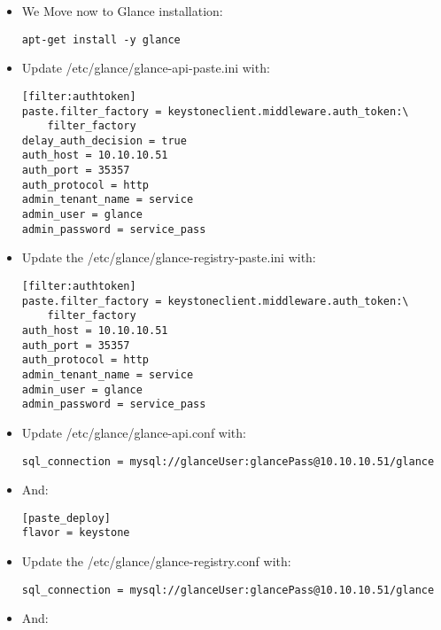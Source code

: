 \begin{itemize}
\item We Move now to Glance installation:

\begin{verbatim}
apt-get install -y glance
\end{verbatim}


\item Update \slash etc\slash glance\slash glance-api-paste.ini with:

\begin{verbatim}
[filter:authtoken]  
paste.filter_factory = keystoneclient.middleware.auth_token:\
    filter_factory  
delay_auth_decision = true  
auth_host = 10.10.10.51  
auth_port = 35357  
auth_protocol = http  
admin_tenant_name = service  
admin_user = glance  
admin_password = service_pass  
\end{verbatim}


\item Update the \slash etc\slash glance\slash glance-registry-paste.ini with:

\begin{verbatim}
[filter:authtoken]  
paste.filter_factory = keystoneclient.middleware.auth_token:\
    filter_factory  
auth_host = 10.10.10.51  
auth_port = 35357  
auth_protocol = http  
admin_tenant_name = service  
admin_user = glance  
admin_password = service_pass  
\end{verbatim}


\item Update \slash etc\slash glance\slash glance-api.conf with:

\begin{verbatim}
sql_connection = mysql://glanceUser:glancePass@10.10.10.51/glance
\end{verbatim}


\item And:

\begin{verbatim}
[paste_deploy]  
flavor = keystone
\end{verbatim}


\item Update the \slash etc\slash glance\slash glance-registry.conf with:

\begin{verbatim}
sql_connection = mysql://glanceUser:glancePass@10.10.10.51/glance
\end{verbatim}


\item And:


\end{itemize}
